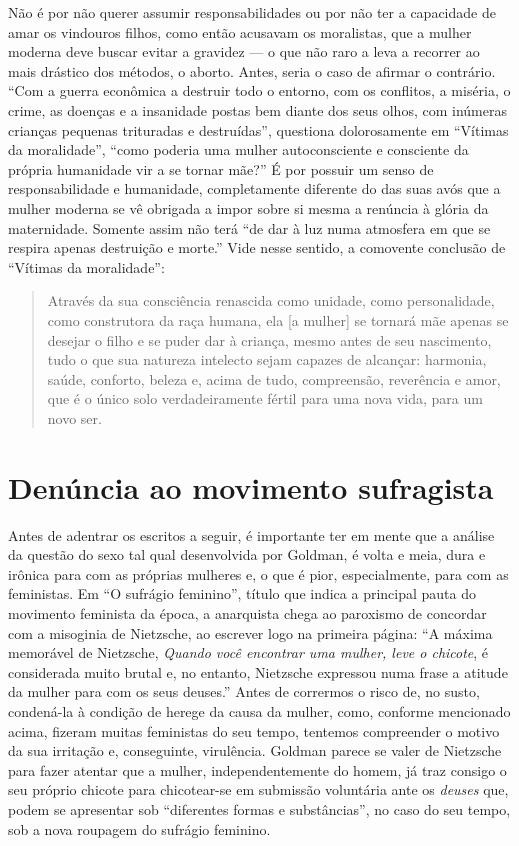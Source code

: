 Não é por não
querer assumir responsabilidades ou por não ter a capacidade de amar os
vindouros filhos, como então acusavam os moralistas, que a mulher
moderna deve buscar evitar a gravidez --- o que não raro a leva a
recorrer ao mais drástico dos métodos, o aborto. Antes, seria o caso de
afirmar o contrário. ``Com a guerra econômica a destruir todo o entorno,
com os conflitos, a miséria, o crime, as doenças e a insanidade postas
bem diante dos seus olhos, com inúmeras crianças pequenas trituradas e
destruídas'', questiona dolorosamente em ``Vítimas da moralidade'',
``como poderia uma mulher autoconsciente e consciente da própria
humanidade vir a se tornar mãe?'' É por possuir um senso de
responsabilidade e humanidade, completamente diferente do das suas avós
que a mulher moderna se vê obrigada a impor sobre si mesma a renúncia à
glória da maternidade. Somente assim não terá ``de dar à luz numa
atmosfera em que se respira apenas destruição e morte.'' Vide nesse
sentido, a comovente conclusão de ``Vítimas da moralidade'':

\begin{quote}
Através da sua consciência renascida como unidade, como personalidade,
como construtora da raça humana, ela {[}a mulher{]} se tornará mãe
apenas se desejar o filho e se puder dar à criança, mesmo antes de seu
nascimento, tudo o que sua natureza intelecto sejam capazes de alcançar:
harmonia, saúde, conforto, beleza e, acima de tudo, compreensão,
reverência e amor, que é o único solo verdadeiramente fértil para uma
nova vida, para um novo ser.
\end{quote}

\section{Denúncia ao movimento sufragista}

Antes de adentrar os escritos a seguir, é importante ter em mente que a
análise da questão do sexo tal qual desenvolvida por Goldman, é
volta e meia, dura e irônica para com as próprias mulheres e, o que é
pior, especialmente, para com as feministas. Em ``O sufrágio feminino'',
título que indica a principal pauta do movimento feminista da época, a
anarquista chega ao paroxismo de concordar com a misoginia de Nietzsche,
ao escrever logo na primeira página: ``A máxima memorável de Nietzsche,
\textit{Quando você encontrar uma mulher, leve o chicote}, é considerada muito
brutal e, no entanto, Nietzsche expressou numa frase a atitude da mulher
para com os seus deuses.'' Antes de corrermos o risco de, no susto,
condená-la à condição de herege da causa da mulher, como, conforme
mencionado acima, fizeram muitas feministas do seu tempo, tentemos
compreender o motivo da sua irritação e, conseguinte, virulência.
Goldman parece se valer de Nietzsche para fazer atentar que a mulher,
independentemente do homem, já traz consigo o seu próprio chicote para
chicotear-se em submissão voluntária ante os \textit{deuses} que, podem se
apresentar sob ``diferentes formas e substâncias'', no caso do seu
tempo, sob a nova roupagem do sufrágio feminino. 

